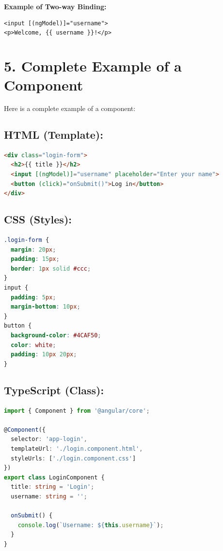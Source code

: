 \documentclass{article}
\begin{document}
\textbf{Example of Two-way Binding:}
\begin{verbatim}
<input [(ngModel)]="username">
<p>Welcome, {{ username }}!</p>
\end{verbatim}

\section*{5. Complete Example of a Component}

Here is a complete example of a component:

\subsection*{HTML (Template):}
\begin{lstlisting}[language=HTML, caption={HTML example of a login form}, label={lst:login-form}]
<div class="login-form">
  <h2>{{ title }}</h2>
  <input [(ngModel)]="username" placeholder="Enter your name">
  <button (click)="onSubmit()">Log in</button>
</div>
\end{lstlisting}

\subsection*{CSS (Styles):}
\begin{lstlisting}[language=CSS, caption={CSS styling for login form}, label={lst:css-login-form}]
.login-form {
  margin: 20px;
  padding: 15px;
  border: 1px solid #ccc;
}
input {
  padding: 5px;
  margin-bottom: 10px;
}
button {
  background-color: #4CAF50;
  color: white;
  padding: 10px 20px;
}
\end{lstlisting}

\subsection*{TypeScript (Class):}
\begin{lstlisting}[language=TypeScript, caption={TypeScript class for login functionality}, label={lst:typescript-login}]
import { Component } from '@angular/core';

@Component({
  selector: 'app-login',
  templateUrl: './login.component.html',
  styleUrls: ['./login.component.css']
})
export class LoginComponent {
  title: string = 'Login';
  username: string = '';

  onSubmit() {
    console.log(`Username: ${this.username}`);
  }
}
\end{lstlisting}
\end{document}

